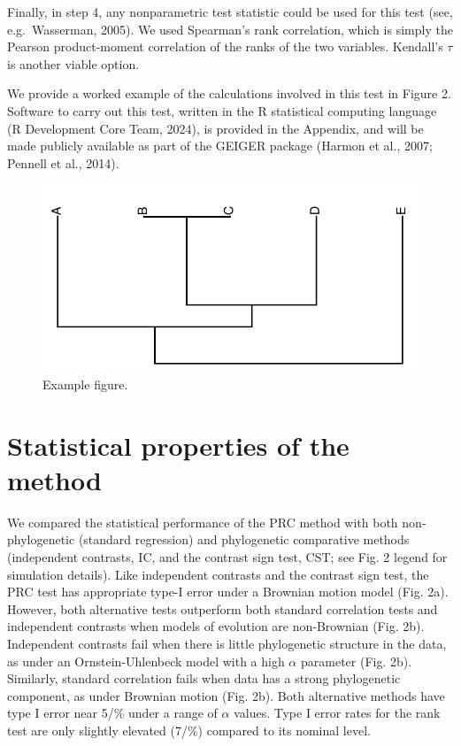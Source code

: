\documentclass[fleqn,10pt,lineno]{wlpeerj} %
\begin{document}
Finally, in step 4, any nonparametric test statistic could be used for this test (see, e.g.~Wasserman, 2005). We used Spearman's rank correlation, which is simply the Pearson product-moment correlation of the ranks of the two variables. Kendall's \(\tau\) is another viable option.

We provide a worked example of the calculations involved in this test in Figure 2. Software to carry out this test, written in the R statistical computing language (R Development Core Team, 2024), is provided in the Appendix, and will be made publicly available as part of the GEIGER package (Harmon et al., 2007; Pennell et al., 2014).

\begin{figure}
\centering
\includegraphics{Harmon-and-Revell_NonParametricPCM.PeerJ_files/figure-latex/Harmon-fig1-1.pdf}
\caption{\label{fig:Harmon-fig1}Example figure.}
\end{figure}

\section{Statistical properties of the method}\label{statistical-properties-of-the-method}

We compared the statistical performance of the PRC method with both non-phylogenetic (standard regression) and phylogenetic comparative methods (independent contrasts, IC, and the contrast sign test, CST; see Fig. 2 legend for simulation details). Like independent contrasts and the contrast sign test, the PRC test has appropriate type-I error under a Brownian motion model (Fig. 2a). However, both alternative tests outperform both standard correlation tests and independent contrasts when models of evolution are non-Brownian (Fig. 2b). Independent contrasts fail when there is little phylogenetic structure in the data, as under an Ornstein-Uhlenbeck model with a high \(\alpha\) parameter (Fig. 2b). Similarly, standard correlation fails when data has a strong phylogenetic component, as under Brownian motion (Fig. 2b). Both alternative methods have type I error near 5/\% under a range of \(\alpha\) values. Type I error rates for the rank test are only slightly elevated (7/\%) compared to its nominal level.
\end{document}
